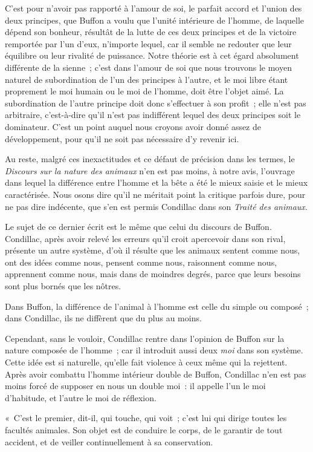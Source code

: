 \documentclass[french,twoside]{book} %
\begin{document}
C’est pour n’avoir pas rapporté à l’amour de soi, le parfait accord et l’union des deux principes, que Buffon a voulu que l’unité intérieure de l’homme, de laquelle dépend son bonheur, résultât de la lutte de ces deux principes et de la victoire remportée par l’un d’eux, n’importe lequel, car il semble ne redouter que leur équilibre ou leur rivalité de puissance. Notre théorie est à cet égard absolument différente de la sienne ; c’est dans l’amour de soi que nous trouvons le moyen naturel de subordination de l’un des principes à l’autre, et le moi libre étant proprement le moi humain ou le moi de l’homme, doit être l’objet aimé. La subordination de l’autre principe doit donc s’effectuer à son profit ; elle n’est pas arbitraire, c’est-à-dire qu’il n’est pas indifférent lequel des deux principes soit le dominateur. C’est un point auquel nous croyons avoir donné assez de développement, pour qu’il ne soit pas nécessaire d’y revenir ici.\par
Au reste, malgré ces inexactitudes et ce défaut de précision dans les termes, le {\itshape Discours sur la nature des animaux} n’en est pas moins, à notre avis, l’ouvrage dans lequel la différence entre l’homme et la bête a été le mieux saisie et le mieux caractérisée. Nous osons dire qu’il ne méritait point la critique parfois dure, pour ne pas dire indécente, que s’en est permis Condillac dans son {\itshape Traité des animaux}.\par
Le sujet de ce dernier écrit est le même que celui du discours de Buffon. Condillac, après avoir relevé les erreurs qu’il croit apercevoir dans son rival, présente un autre système, d’où il résulte que les animaux sentent comme nous, ont des idées comme nous, pensent comme nous, raisonnent comme nous, apprennent comme nous, mais dans de moindres degrés, parce que leurs besoins sont plus bornés que les nôtres.\par
Dans Buffon, la différence de l’animal à l’homme est celle du simple ou composé ; dans Condillac, ils ne diffèrent que du plus au moins.\par
Cependant, sans le vouloir, Condillac rentre dans l’opinion de Buffon sur la nature composée de l’homme ; car il introduit aussi deux {\itshape moi} dans son système. Cette idée est si naturelle, qu’elle fait violence à ceux même qui la rejettent. Après avoir combattu l’homme intérieur double de Buffon, Condillac n’en est pas moins forcé de supposer en nous un double moi : il appelle l’un le moi d’habitude, et l’autre le moi de réflexion.\par
« C’est le premier, dit-il, qui touche, qui voit ; c’est lui qui dirige toutes les facultés animales. Son objet est de conduire le corps, de le garantir de tout accident, et de veiller continuellement à sa conservation.\par
\end{document}
